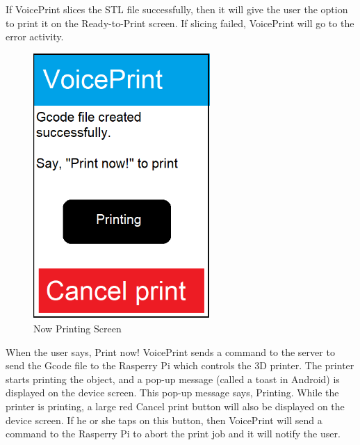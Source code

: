 If VoicePrint slices the STL file successfully, then it will give the user the option to print it on the Ready-to-Print screen. If slicing failed, VoicePrint will go to the error activity.

\newpage

\begin{figure}[h!]
	\centering
   	\includegraphics[width=0.60\textwidth]{images/Activity6b.png}
   	\caption{Now Printing Screen}
\end{figure}

When the user says, Print now! VoicePrint sends a command to the server to send the Gcode file to the Rasperry Pi which controls the 3D printer. The printer starts printing the object, and a pop-up message (called a toast in Android) is displayed on the device screen. This pop-up message says, Printing. While the printer is printing, a large red Cancel print button will also be displayed on the device screen. If he or she taps on this button, then VoicePrint will send a command to the Rasperry Pi to abort the print job and it will notify the user.

\newpage

